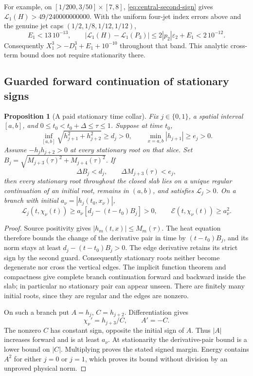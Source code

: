 \documentclass[11pt]{article}
\numberwithin{equation}{section}
\newtheorem{proposition}[theorem]{Proposition}
\theoremstyle{definition}
\theoremstyle{remark}
\newcommand{\Lag}{\mathscr L}
\begin{document}
For example, on \([1/200,3/50]\times[7,8]\),
\eqref{eq:central-second-sign} gives
\(\Lag_1(H)>49/240000000000\). With the uniform four-jet
index errors above and the genuine jet caps
\((1/2,1/8,1/12,1/12)\),
\[
 E_1<13\,10^{-13},\qquad
 |\Lag_1(H)-\Lag_1(P_3)|
 \le2|p_2|\varepsilon_2+E_1<2\,10^{-12}.
\]
Consequently \(X_1^3>-D_1^3+E_1+10^{-10}\) throughout that band.
This analytic cross-term bound does not require stationarity there.

\subsection{Guarded forward continuation of stationary signs}
\label{sec:forward-collars}

\begin{proposition}[A paid stationary time collar]
\label{prop:stationary-time-collar}
Fix \(j\in\{0,1\}\), a spatial interval \([a,b]\), and
\(0\le t_0<t_0+\Delta\le\tau\le1\). Suppose at time \(t_0\),
\[
 \inf_{[a,b]}\sqrt{h_{j+1}^2+h_{j+2}^2}\ge d_j>0,
 \qquad
 \min_{x=a,b}|h_{j+1}|\ge e_j>0.
\]
Assume \(-h_jh_{j+2}>0\) at every stationary root on that slice.
Set \(B_j=\sqrt{M_{j+3}(\tau)^2+M_{j+4}(\tau)^2}\).
If
\begin{equation}
 \Delta B_j<d_j,\qquad \Delta M_{j+3}(\tau)<e_j,
 \label{eq:stationary-collar-guards}
\end{equation}
then every stationary root throughout the closed slab lies on a unique
regular continuation of an initial root, remains in \((a,b)\), and
satisfies \(\Lag_j>0\). On a branch with initial
\(a_\nu=|h_j(t_0,x_\nu)|\),
\[
 \Lag_j(t,\chi_\nu(t))
 \ge a_\nu[d_j-(t-t_0)B_j]>0,
 \qquad \mathcal E(t,\chi_\nu(t))\ge a_\nu^2.
\]
\end{proposition}

\begin{proof}
Source positivity gives \(|h_m(t,x)|\le M_m(\tau)\).
The heat equation therefore bounds the change of the derivative pair
in time by \((t-t_0)B_j\), and its norm stays at least
\(d_j-(t-t_0)B_j>0\). The edge derivative retains its strict sign
by the second guard. Consequently stationary roots neither become
degenerate nor cross the vertical edges. The implicit function theorem
and compactness give complete branch continuation forward and backward
inside the slab; in particular no stationary pair can appear unseen.
There are finitely many initial roots, since they are regular and the
edges are nonzero.

On such a branch put \(A=h_j\), \(C=h_{j+2}\). Differentiation gives
\[
 \chi_\nu'=h_{j+3}/C,\qquad A'=-C.
\]
The nonzero \(C\) has constant sign, opposite the initial sign of \(A\).
Thus \(|A|\) increases forward and is at least \(a_\nu\).
At stationarity the derivative-pair bound is a lower bound on \(|C|\).
Multiplying proves the stated signed margin. Energy contains \(A^2\)
for either \(j=0\) or \(j=1\), which proves its bound without division
by an unproved physical norm.
\end{proof}
\end{document}
